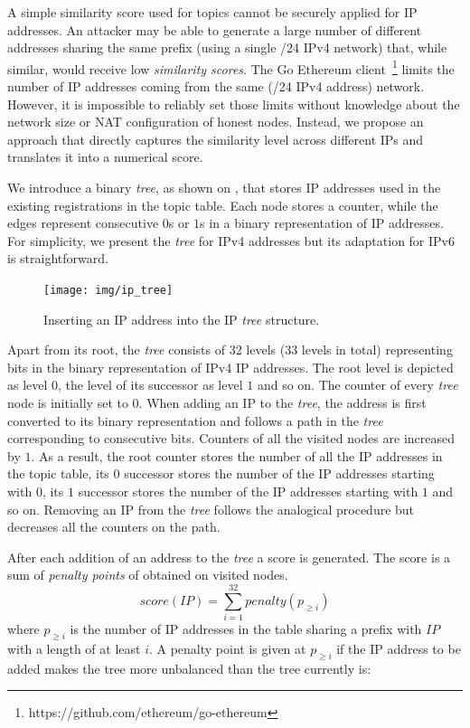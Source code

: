 A simple similarity score used for topics cannot be securely applied for IP addresses. 
An attacker may be able to generate a large number of different addresses sharing the same prefix (\eg using a single /24 IPv4 network) that, while similar, would receive low \emph{similarity scores}. 
The Go Ethereum client~\footnote{https://github.com/ethereum/go-ethereum} limits the number of IP addresses coming from the same (\eg /24 IPv4 address) network.
However, it is impossible to reliably set those limits without knowledge about the network size or NAT configuration of honest nodes. 
Instead, we propose an approach that directly captures the similarity level across different IPs and translates it into a numerical score. 

We introduce a binary \emph{tree}, as shown on , that stores IP addresses used in the existing registrations in the topic table.
Each node stores a counter, while the edges represent consecutive $0$s or $1$s in a binary representation of IP addresses.
For simplicity,  we present the \emph{tree} for IPv4 addresses but its adaptation for IPv6 is straightforward.

\begin{figure}
    \texttt{[image: img/ip\_tree]}
    \caption{Inserting an IP address into the IP \emph{tree} structure. }
    \label{fig:ip_tree}
\end{figure}

Apart from its root,  the \emph{tree} consists of 32 levels (33 levels in total) representing bits in the binary representation of IPv4 IP addresses. 
The root level is depicted as level $0$, the level of its successor as level $1$ and so on. 
The counter of every \emph{tree} node is initially set to $0$. When adding an IP to the \emph{tree},  the address is first converted to its binary representation and follows a path in the \emph{tree} corresponding to consecutive bits. 
Counters of all the visited nodes are increased by $1$. 
As a result, the root counter stores the number of all the IP addresses in the topic table, its $0$ successor stores the number of the IP addresses starting with $0$, its $1$ successor stores the number of the IP addresses starting with $1$ and so on. 
Removing an IP from the \emph{tree} follows the analogical procedure but decreases all the counters on the path. 

After each addition of an address to the \emph{tree} a score is generated.
The score is a sum of \emph{penalty points} of obtained on visited nodes. 
$$score(IP)=\sum_{i=1}^{32} \textit{penalty}(p_{\geq i}) $$
where $p_{\geq i}$ is the number of IP addresses in the table sharing a prefix with $IP$ with a length of at least $i$. A penalty point is given at $p_{\geq i}$ if the IP address to be added makes the tree more unbalanced than the tree currently is:

